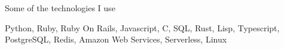 \documentclass[calibri]{mcdowellcv}
\begin{document}
\begin{cvsection}{Some of the technologies I use}
  \begin{cvsubsection}{}{}{}
    Python, Ruby, Ruby On Rails, Javascript, C, SQL, Rust, Lisp, Typescript, PostgreSQL, Redis, Amazon Web Services, Serverless, Linux
  \end{cvsubsection}
\end{cvsection}
\end{document}
